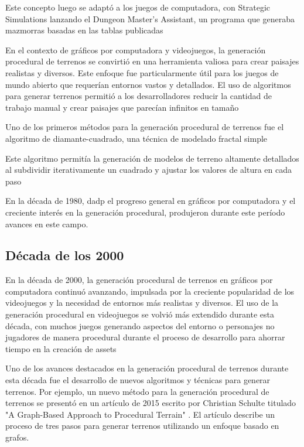 Este concepto luego se adaptó a los juegos de computadora, con Strategic Simulations lanzando el Dungeon Master's Assistant, un programa que generaba mazmorras basadas en las tablas publicadas
\cite{ComputerGraphics}

En el contexto de gráficos por computadora y videojuegos, la generación procedural de terrenos se convirtió en una herramienta valiosa para crear paisajes realistas y diversos. Este enfoque fue particularmente útil para los juegos de mundo abierto que requerían entornos vastos y detallados. El uso de algoritmos para generar terrenos permitió a los desarrolladores reducir la cantidad de trabajo manual y crear paisajes que parecían infinitos en tamaño
\cite{SurveyProceduralWorlds}

Uno de los primeros métodos para la generación procedural de terrenos fue el algoritmo de diamante-cuadrado, una técnica de modelado fractal simple

Este algoritmo permitía la generación de modelos de terreno altamente detallados al subdividir iterativamente un cuadrado y ajustar los valores de altura en cada paso
\cite{ComputerGraphics}

En la década de 1980, dadp el progreso general en gráficos por computadora y el creciente interés en la generación procedural, produjeron durante este período avances en este campo.

\subsection{Década de los 2000}

En la década de 2000, la generación procedural de terrenos en gráficos por computadora continuó avanzando, impulsada por la creciente popularidad de los videojuegos y la necesidad de entornos más realistas y diversos. El uso de la generación procedural en videojuegos se volvió más extendido durante esta década, con muchos juegos generando aspectos del entorno o personajes no jugadores de manera procedural durante el proceso de desarrollo para ahorrar tiempo en la creación de assets \cite{TexturingModelingProcAproach}

Uno de los avances destacados en la generación procedural de terrenos durante esta década fue el desarrollo de nuevos algoritmos y técnicas para generar terrenos. Por ejemplo, un nuevo método para la generación procedural de terrenos se presentó en un artículo de 2015 escrito por Christian Schulte titulado "A Graph-Based Approach to
Procedural Terrain" \cite{ProceduralTerrainAproach}. El artículo describe un proceso de tres pasos para generar terrenos utilizando un enfoque basado en grafos.


